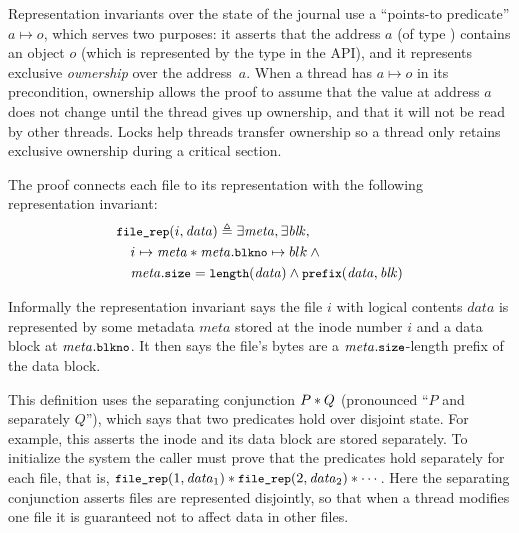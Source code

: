 
Representation invariants over the state of the journal use a
``points-to predicate'' $a \mapsto o$, which serves two purposes: it asserts
that the address $a$ (of type ) contains an object $o$ (which is
represented by the  type in the API), and it represents exclusive
\emph{ownership} over the address~$a$. When a thread has $a \mapsto o$ in its
precondition, ownership allows the proof to assume that the value at address $a$
does not change until the thread gives up ownership, and that it will not be
read by other threads.  Locks help threads transfer ownership so a thread only
retains exclusive ownership during a critical section.

The \simplenfs proof connects each file to its representation with the following
representation invariant:
%
\begin{align*}
  &\cc{file_rep}(i, \mathit{data}) \triangleq \exists \mathit{meta}, \exists \mathit{blk}, \\
  &\quad i \mapsto \mathit{meta} \sep \mathit{meta}.\cc{blkno} \mapsto blk \land \phantom{} \\
  &\quad \mathit{meta}.\cc{size} = \cc{length}(\mathit{data}) \land \cc{prefix}(\mathit{data}, \mathit{blk})
\end{align*}

Informally the representation invariant says the file $i$ with logical contents $\mathit{data}$ is represented by some
metadata $\mathit{meta}$ stored at the inode number $i$ and a data block at
$\mathit{meta}.\cc{blkno}$. It then says the file's bytes are a
$\mathit{meta}.\cc{size}$-length prefix of the data block.

This definition uses the separating conjunction $P * Q$ (pronounced ``$P$ and
separately $Q$''), which says that two predicates hold over disjoint state.
For example, this asserts the inode and its data block are stored
separately. To initialize the system the caller must prove that the
 predicates hold separately for each file, that is,
$\cc{file_rep}(1, \mathit{data}_1) \sep \cc{file_rep}(2, \mathit{data}_2) \sep \cdots$. Here the
separating conjunction asserts files are represented disjointly, so that when a
thread modifies one file it is guaranteed not to affect data in other files.

